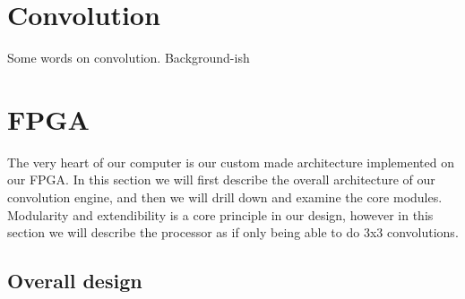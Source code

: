 \section{Convolution}
Some words on convolution. Background-ish

\section{FPGA}

The very heart of our computer is our custom made architecture implemented on our FPGA.
In this section we will first describe the overall architecture of our convolution engine, and then we will drill down and examine the core modules.
Modularity and extendibility is a core principle in our design, however in this section we will describe the processor as if only being able to do 3x3 convolutions.

\subsection{Overall design}

